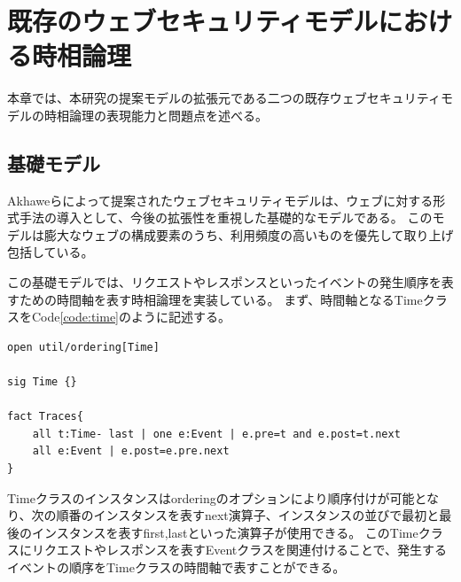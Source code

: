 \documentclass[journal]{IEEEtran}
\begin{document}
\section{既存のウェブセキュリティモデルにおける時相論理}
本章では、本研究の提案モデルの拡張元である二つの既存ウェブセキュリティモデルの時相論理の表現能力と問題点を述べる。

\subsection{基礎モデル}
\label{sec:based-model}
Akhaweらによって提案されたウェブセキュリティモデル\cite{based-model}は、ウェブに対する形式手法の導入として、今後の拡張性を重視した基礎的なモデルである。
このモデルは膨大なウェブの構成要素のうち、利用頻度の高いものを優先して取り上げ包括している。

この基礎モデルでは、リクエストやレスポンスといったイベントの発生順序を表すための時間軸を表す時相論理を実装している。
まず、時間軸となるTimeクラスをCode\ref{code:time}のように記述する。
\begin{lstlisting}[caption=基礎モデルにおける時間軸, label=code:time]
open util/ordering[Time]

sig Time {}

fact Traces{
	all t:Time- last | one e:Event | e.pre=t and e.post=t.next
	all e:Event | e.post=e.pre.next
}
\end{lstlisting}
Timeクラスのインスタンスはorderingのオプションにより順序付けが可能となり、次の順番のインスタンスを表すnext演算子、インスタンスの並びで最初と最後のインスタンスを表すfirst,lastといった演算子が使用できる。
このTimeクラスにリクエストやレスポンスを表すEventクラスを関連付けることで、発生するイベントの順序をTimeクラスの時間軸で表すことができる。
\end{document}
